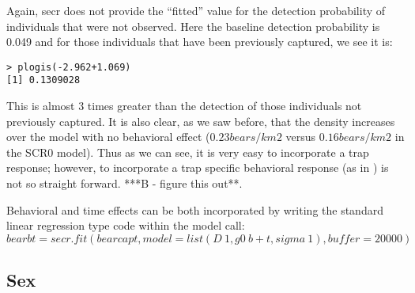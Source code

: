 Again, secr does not provide the ``fitted'' value for the detection probability of individuals that were not observed.  Here the baseline detection probability is 0.049 and for those individuals that have been previously captured, we see it is:
\begin{verbatim}
> plogis(-2.962+1.069)
[1] 0.1309028

\end{verbatim}

This is almost 3 times greater than the detection of those individuals
not previously captured.  It is also clear, as we saw before, that the
density increases over the model with no behavioral effect ($0.23
bears/km2$ versus $0.16 bears/km2$ in the SCR0 model).  Thus as we can
see, it is very easy to incorporate a trap response; however, to
incorporate a trap specific behavioral response (as in \citet{royle_etal:2009}) is not so straight forward.  ***B - figure this out**.

Behavioral and time effects can be both incorporated by writing the standard linear regression type code within the model call:
\[
bearbt=secr.fit (bearcapt, model = list(D~1, g0~b + t, sigma~1), buffer = 20000)
\]



\subsection{Sex}

